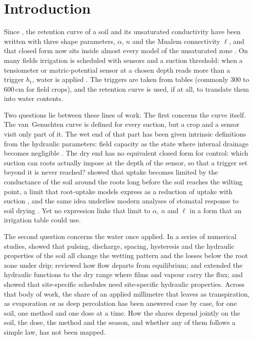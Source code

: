 \documentclass[review,12pt,authoryear]{elsarticle}
\newcommand{\htr}{h_{\mathrm{t}}}
\begin{document}
\linenumbers

\section{Introduction}
Since \citet{vanGenuchten1980}, the retention curve of a soil and its unsaturated conductivity have been written with three shape parameters, $\alpha$, $n$ and the Mualem connectivity $\ell$, and that closed form now sits inside almost every model of the unsaturated zone \citep{vanGenuchten1985,Nielsen1986,Schaap2001,Simunek2016,Vereecken2016,Vereecken2019}. On many fields irrigation is scheduled with sensors and a suction threshold: when a tensiometer or matric-potential sensor at a chosen depth reads more than a trigger $\htr$, water is applied \citep{Allen1998}. The triggers are taken from tables (commonly 300 to 600\,cm for field crops), and the retention curve is used, if at all, to translate them into water contents.

Two questions lie between these lines of work. The first concerns the curve itself. The van~Genuchten curve is defined for every suction, but a crop and a sensor visit only part of it. The wet end of that part has been given intrinsic definitions from the hydraulic parameters: field capacity as the state where internal drainage becomes negligible \citep{Twarakavi2009,Assouline2014}. The dry end has no equivalent closed form for control: which suction can roots actually impose at the depth of the sensor, so that a trigger set beyond it is never reached? \citet{Gardner1960} showed that uptake becomes limited by the conductance of the soil around the roots long before the soil reaches the wilting point, a limit that root-uptake models express as a reduction of uptake with suction \citep{Feddes1978}, and the same idea underlies modern analyses of stomatal response to soil drying \citep{Carminati2020}. Yet no expression links that limit to $\alpha$, $n$ and $\ell$ in a form that an irrigation table could use.

The second question concerns the water once applied. In a series of numerical studies, \citet{Elmaloglou2007,Elmaloglou2008,Elmaloglou2009a,Elmaloglou2009b,Elmaloglou2010} showed that pulsing, discharge, spacing, hysteresis and the hydraulic properties of the soil all change the wetting pattern and the losses below the root zone under drip; \citet{Diamantopoulos2012VZJ} reviewed how flow departs from equilibrium; \citet{Weber2019} and \citet{Iden2021} extended the hydraulic functions to the dry range where films and vapour carry the flux; and \citet{Kumar2022} showed that site-specific schedules need site-specific hydraulic properties. Across that body of work, the share of an applied millimetre that leaves as transpiration, as evaporation or as deep percolation has been answered case by case, for one soil, one method and one dose at a time. How the shares depend jointly on the soil, the dose, the method and the season, and whether any of them follows a simple law, has not been mapped.
\end{document}
